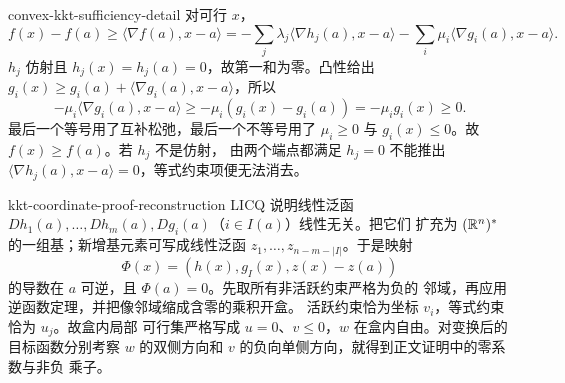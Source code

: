 \begin{solution}{convex-kkt-sufficiency-detail}
对可行 $x$，
\[
 f(x)-f(a)\ge\langle\nabla f(a),x-a\rangle
 =-\sum_j\lambda_j\langle\nabla h_j(a),x-a\rangle
  -\sum_i\mu_i\langle\nabla g_i(a),x-a\rangle.
\]
$h_j$ 仿射且 $h_j(x)=h_j(a)=0$，故第一和为零。凸性给出
$g_i(x)\ge g_i(a)+\langle\nabla g_i(a),x-a\rangle$，所以
\[
 -\mu_i\langle\nabla g_i(a),x-a\rangle
 \ge-\mu_i(g_i(x)-g_i(a))
 =-\mu_i g_i(x)\ge0.
\]
最后一个等号用了互补松弛，最后一个不等号用了
$\mu_i\ge0$ 与 $g_i(x)\le0$。故 $f(x)\ge f(a)$。若 $h_j$ 不是仿射，
由两个端点都满足 $h_j=0$ 不能推出
$\langle\nabla h_j(a),x-a\rangle=0$，等式约束项便无法消去。
\end{solution}

\begin{solution}{kkt-coordinate-proof-reconstruction}
LICQ 说明线性泛函
$Dh_1(a),\ldots,Dh_m(a),Dg_i(a)$（$i\in I(a)$）线性无关。把它们
扩充为 $(\mathbb{R}^n)^*$ 的一组基；新增基元素可写成线性泛函
$z_1,\ldots,z_{n-m-|I|}$。于是映射
\[
 \Phi(x)=(h(x),g_I(x),z(x)-z(a))
\]
的导数在 $a$ 可逆，且 \(\Phi(a)=0\)。先取所有非活跃约束严格为负的
邻域，再应用逆函数定理，并把像邻域缩成含零的乘积开盒。
活跃约束恰为坐标 $v_i$，等式约束恰为 $u_j$。故盒内局部
可行集严格写成 $u=0$、$v\le0$，$w$ 在盒内自由。对变换后的目标函数分别考察
$w$ 的双侧方向和 $v$ 的负向单侧方向，就得到正文证明中的零系数与非负
乘子。
\end{solution}
